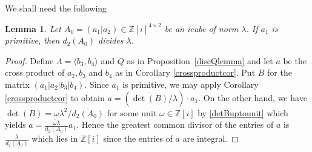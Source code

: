 \documentclass[11pt]{amsart}
\newcommand{\ZZ}{\mathbb{Z}}
\newtheorem{lemma}[proposition]{Lemma}
\theoremstyle{definition}
\theoremstyle{remark}
\begin{document}
We shall need the following

\begin{lemma}\label{d2divlambda}
Let $A_0=(a_1|a_2)\in\mathbb Z[i]^{4\times 2}$ be an icube of norm $\lambda$. If $a_1$ is primitive, then $d_2(A_0)$ divides $\lambda$.
\end{lemma}
\begin{proof}
Define $\Lambda=\langle b_3,b_4\rangle$ and $Q$ as in Proposition~\ref{discQlemma} and let $a$ be the cross product of $a_2,b_3$ and $b_4$ as in Corollary \ref{crossproductcor}. Put $B$ for the matrix $(a_1|a_2|b_3|b_4)$. Since $a_1$ is primitive, we may apply Corollary \ref{crossproductcor} to obtain $a=(\overline{\det(B)}/\lambda)\cdot a_1$. On the other hand, we have $\det(B)=\omega\lambda^2/\overline{d_2(A_0)}$ for some unit $\omega\in \ZZ[i]$ by \eqref{detBuptounit} which yields $a=\frac{\overline{\omega}\lambda}{d_2(A_0)}a_1$. Hence the greatest common divisor of the entries of $a$ is $\frac{\lambda}{d_2(A_0)}$ which lies in $\ZZ[i]$ since the entries of $a$ are integral.
\end{proof}
\end{document}
